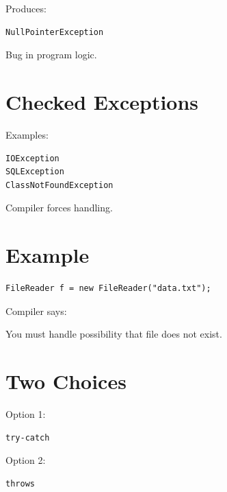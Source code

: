 \documentclass[11pt,a4paper]{book}
\begin{document}
Produces:

\begin{verbatim} 
NullPointerException
\end{verbatim}

Bug in program logic.

\section{Checked Exceptions}

Examples:

\begin{verbatim} 
IOException
SQLException
ClassNotFoundException
\end{verbatim}

Compiler forces handling.

\section{Example}

\begin{verbatim} 
FileReader f = new FileReader("data.txt");
\end{verbatim}


Compiler says:


You must handle possibility
that file does not exist.


\section{Two Choices}

Option 1:

\begin{verbatim} 
try-catch
\end{verbatim}


Option 2:

\begin{verbatim} 
throws
\end{verbatim}

\end{document}
